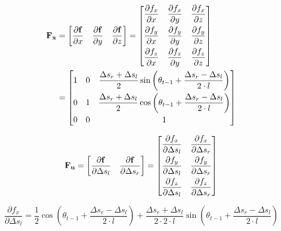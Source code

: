\begin{equation}\label{eq:Fx}
\begin{split}
	\mathbf{F_x} &= \begin{bmatrix}
	\dfrac{\partial \mathbf{f}}{\partial x} & 
	\dfrac{\partial \mathbf{f}}{\partial y} &
	\dfrac{\partial \mathbf{f}}{\partial z}
\end{bmatrix} = \begin{bmatrix}
	\dfrac{\partial f_x}{\partial  x } & 	\dfrac{\partial f_x}{\partial y}  & 	\dfrac{\partial f_x}{\partial z} \\[2ex]
	\dfrac{\partial f_y}{\partial  x } & 	\dfrac{\partial f_y}{\partial y}  & 	\dfrac{\partial f_y}{\partial z} \\[2ex]
	\dfrac{\partial f_z}{\partial  x } & 	\dfrac{\partial f_z}{\partial y}  & 	\dfrac{\partial f_z}{\partial z} 
\end{bmatrix} \\
&=\begin{bmatrix}
	1 & 0  & \dfrac{\Delta s_r + \Delta s_l}{2}\sin\left( \theta_{t-1} + \dfrac{\Delta s_r - \Delta s_l}{2\cdot l} \right)  \\[2ex]
	0 & 1  & 	 \dfrac{\Delta s_r + \Delta s_l}{2}\cos\left( \theta_{t-1} + \dfrac{\Delta s_r - \Delta s_l}{2\cdot l} \right)  \\[2ex]
	0 & 0  & 1
\end{bmatrix}
\end{split}
\end{equation}



\begin{equation}\label{eq:Fu}
	\mathbf{F_u} = \begin{bmatrix}
		\dfrac{\partial \mathbf{f}}{\partial \Delta s_l} & 
		\dfrac{\partial \mathbf{f}}{\partial \Delta s_r}
	\end{bmatrix} = \begin{bmatrix}
	\dfrac{\partial f_x}{\partial \Delta s_l } & 	\dfrac{\partial f_x}{\partial \Delta s_r } \\[2ex]
	\dfrac{\partial f_y}{\partial \Delta s_l } & 	\dfrac{\partial f_y}{\partial \Delta s_r } \\[2ex]
	\dfrac{\partial f_z}{\partial \Delta s_l } & 	\dfrac{\partial f_z}{\partial \Delta s_r }
	\end{bmatrix}
\end{equation}

\begin{equation}\label{eq:fxsl}
	\dfrac{\partial f_x}{\partial \Delta s_l } =  
	\dfrac{1}{2}\cos\left( \theta_{t-1} + \dfrac{\Delta s_r - \Delta s_l}{2\cdot l}\right)  + \dfrac{\Delta s_r + \Delta s_l}{2\cdot2 \cdot l}\sin\left( \theta_{t-1} + \dfrac{\Delta s_r - \Delta s_l}{2\cdot l}\right) 
\end{equation}

